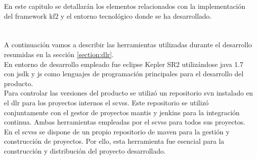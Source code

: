 


\begin{comment}
Este capítulo trata sobre todos los aspectos relacionados con la implementación del sistema en código, haciendo uso de un determinado entorno tecnológico. 
\end{comment}

En este capitulo se detallarán los elementos relacionados con la implementación del \gls{framework} \gls{kf2} y el entorno tecnológico donde se ha desarrollado.


\section{}
\begin{comment}
En esta sección se debe indicar el marco tecnológico utilizado para la construcción del sistema: entorno de desarrollo (IDE), lenguaje de programación, herramientas de ayuda a la construcción y despliegue, control de versiones, repositorio de componentes, integración contínua, etc.
\end{comment}
A continuación vamos a describir las herramientas utilizadas  durante el desarrollo resumidas en la sección \ref{section:dlr}.\\

En entorno de desarrollo empleado fue \gls{eclipse} Kepler SR2 utilizándose \gls{java} 1.7 con \gls{jsdk} y \gls{js} como lenguajes de programación principales para el desarrollo del producto.\\

Para controlar las versiones del producto se utilizó un repositorio \gls{svn} instalado en el \gls{dlr} para los proyectos internos el \gls{scvss}. Este repositorio se utilizó conjuntamente con el gestor de proyectos \gls{mantis} y \gls{jenkins} para la integración continua. Ambas herramientas empleadas por el \gls{scvss} para todos sus proyectos.\\

En el \gls{scvss} se dispone de un propio repositorio de \gls{maven} para la gestión y construcción de proyectos. Por ello, esta herramienta fue esencial para la construcción y distribución del proyecto desarrollado.\\

